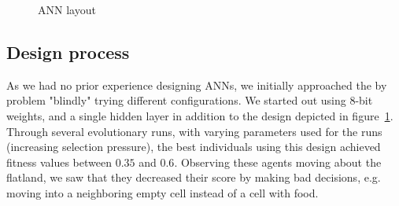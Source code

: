 \documentclass[twoside]{article}
\begin{document}
\begin{multicols}{2}
\begin{figure}[H]

    \caption{ANN layout} \label{fig:ann-layout}
  \end{figure}
  
  \subsection{Design process}

  As we had no prior experience designing ANNs,
  we initially approached the by problem "blindly" trying different configurations.
  We started out using 8-bit weights,
  and a single hidden layer in addition to the design depicted in figure~\ref{fig:ann-layout}.
  Through several evolutionary runs, with varying parameters used for the runs (increasing selection pressure),
  the best individuals using this design achieved fitness values between $0.35$ and $0.6$.
  Observing these agents moving about the flatland,
  we saw that they decreased their score by making bad decisions,
  e.g. moving into a neighboring empty cell instead of a cell with food.


\end{multicols}
\end{document}
